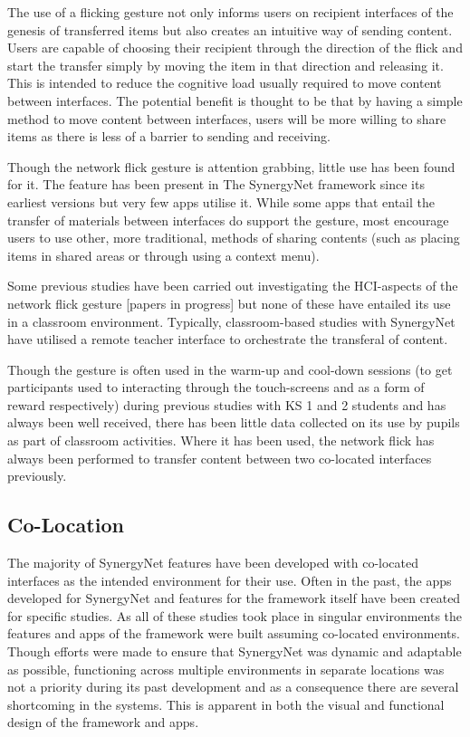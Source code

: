 \documentclass[a4paper,11pt]{article}
\begin{document}
The use of a flicking gesture not only informs users on recipient interfaces of the genesis of transferred items but also creates an intuitive way of sending content.
Users are capable of choosing their recipient through the direction of the flick and start the transfer simply by moving the item in that direction and releasing it.
This is intended to reduce the cognitive load usually required to move content between interfaces.
The potential benefit is thought to be that by having a simple method to move content between interfaces, users will be more willing to share items as there is less of a barrier to sending and receiving.

Though the network flick gesture is attention grabbing, little use has been found for it.
The feature has been present in The SynergyNet framework since its earliest versions but very few apps utilise it.
While some apps that entail the transfer of materials between interfaces do support the gesture, most encourage users to use other, more traditional, methods of sharing contents (such as placing items in shared areas or through using a context menu).

Some previous studies have been carried out investigating the HCI-aspects of the network flick gesture [papers in progress] but none of these have entailed its use in a classroom environment.
Typically, classroom-based studies with SynergyNet have utilised a remote teacher interface to orchestrate the transferal of content. %

Though the gesture is often used in the warm-up and cool-down sessions (to get participants used to interacting through the touch-screens and as a form of reward respectively) during previous studies with KS 1 and 2 students and has always been well received, there has been little data collected on its use by pupils as part of classroom activities.
Where it has been used, the network flick has always been performed to transfer content between two co-located interfaces previously.

\subsection{Co-Location}

The majority of SynergyNet features have been developed with co-located interfaces as the intended environment for their use.
Often in the past, the apps developed for SynergyNet and features for the framework itself have been created for specific studies.
As all of these studies took place in singular environments the features and apps of the framework were built assuming co-located environments.
Though efforts were made to ensure that SynergyNet was dynamic and adaptable as possible, functioning across multiple environments in separate locations was not a priority during its past development and as a consequence there are several shortcoming in the systems.
This is apparent in both the visual and functional design of the framework and apps.
\end{document}

